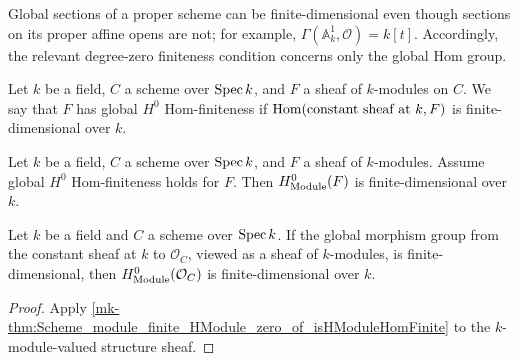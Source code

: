 Global sections of a proper scheme can be finite-dimensional even though sections on its proper affine opens are not; for example, \(\Gamma(\mathbb A^1_k,\mathcal O)=k[t]\). Accordingly, the relevant degree-zero finiteness condition concerns only the global Hom group.

\begin{definition}\label{mk-thm:Scheme_IsHModuleHomFinite}
  \leanok


  Let \(k\) be a field, \(C\) a scheme over \(\operatorname{Spec} k\), and \(F\) a sheaf of \(k\)-modules on \(C\). We say that \(F\) has global \(H^0\) Hom-finiteness if \(\operatorname{Hom}(\text{constant sheaf at }k, F)\) is finite-dimensional over \(k\).
\end{definition}

\begin{theorem}\label{mk-thm:Scheme_module_finite_HModule_zero_of_isHModuleHomFinite}
  \leanok

  Let \(k\) be a field, \(C\) a scheme over \(\operatorname{Spec} k\), and \(F\) a sheaf of \(k\)-modules. Assume global \(H^0\) Hom-finiteness holds for \(F\). Then \(H^0_{\mathrm{Module}}(F)\) is finite-dimensional over \(k\).
\end{theorem}

\begin{theorem}\label{mk-thm:Scheme_module_finite_HModule_zero_of_isHModuleHomFinite_curve}
  \leanok

  Let \(k\) be a field and \(C\) a scheme over \(\operatorname{Spec} k\). If the global morphism group from the constant sheaf at \(k\) to \(\mathcal O_C\), viewed as a sheaf of \(k\)-modules, is finite-dimensional, then \(H^0_{\mathrm{Module}}(\mathcal O_C)\) is finite-dimensional over \(k\).
\end{theorem}

\begin{proof}
  \leanok
  Apply \ref{mk-thm:Scheme_module_finite_HModule_zero_of_isHModuleHomFinite} to the \(k\)-module-valued structure sheaf.
\end{proof}

